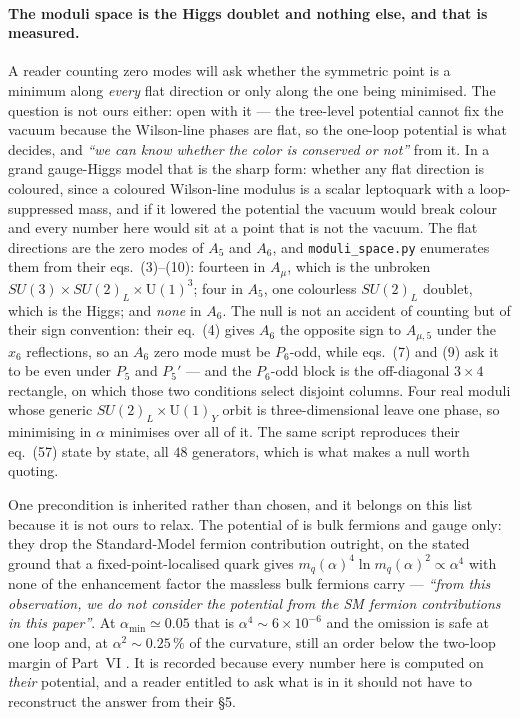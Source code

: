 \documentclass[11pt,a4paper]{article}
\newcommand{\su}[1]{SU(#1)}
\newcommand{\amin}{\alpha_{\min}}
\begin{document}
\paragraph{The moduli space is the Higgs doublet and nothing else, and that is measured.} A reader
counting zero modes will ask whether the symmetric point is a minimum along \emph{every} flat
direction or only along the one being minimised. The question is not ours either: \cite{HY04} open
with it --- the tree-level potential cannot fix the vacuum because the Wilson-line phases are flat,
so the one-loop potential is what decides, and \emph{``we can know whether the color is conserved
or not''} from it. In a grand gauge-Higgs model that is the sharp form: whether any flat direction
is coloured, since a coloured Wilson-line modulus is a scalar
leptoquark with a loop-suppressed mass, and if it lowered the potential the vacuum would break
colour and every number here would sit at a point that is not the vacuum. The flat directions are
the zero modes of $A_5$ and $A_6$, and \texttt{moduli\_\allowbreak space.py} enumerates them from
their eqs.~(3)--(10): fourteen in $A_\mu$, which is the unbroken
$\su3\times\su2_L\times\mathrm{U}(1)^3$; four in $A_5$, one colourless $\su2_L$ doublet, which is
the Higgs; and \emph{none} in $A_6$. The null is not an accident of counting but of their sign
convention: their eq.~(4) gives $A_6$ the opposite sign to $A_{\mu,5}$ under the $x_6$ reflections,
so an $A_6$ zero mode must be $P_6$-odd, while eqs.~(7) and (9) ask it to be even under $P_5$ and
$P_5'$ --- and the $P_6$-odd block is the off-diagonal $3\times4$ rectangle, on which those two
conditions select disjoint columns. Four real moduli whose generic
$\su2_L\times\mathrm{U}(1)_Y$ orbit is three-dimensional leave one phase, so minimising in $\alpha$
minimises over all of it. The same script reproduces their eq.~(57) state by state, all $48$
generators, which is what makes a null worth quoting.

One precondition is inherited rather than chosen, and it belongs on this list because it is not
ours to relax. The potential of \cite{KM25} is bulk fermions and gauge only: they drop the
Standard-Model fermion contribution outright, on the stated ground that a fixed-point-localised
quark gives $m_q(\alpha)^4\ln m_q(\alpha)^2\propto\alpha^4$ with none of the enhancement factor the
massless bulk fermions carry --- \emph{``from this observation, we do not consider the potential
from the SM fermion contributions in this paper''}. At $\amin\simeq0.05$ that is $\alpha^4\sim
6\times10^{-6}$ and the omission is safe at one loop and, at $\alpha^2\sim0.25\,\%$ of the
curvature, still an order below the two-loop margin of Part~VI \cite{PartVI}. It is recorded because
every number here is computed on \emph{their} potential, and a reader entitled to ask what is in it
should not have to reconstruct the answer from their §5.
\end{document}
